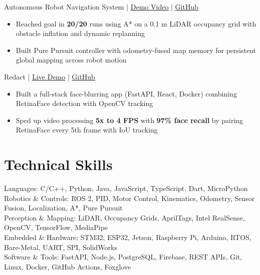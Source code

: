 \documentclass[11pt]{article}       %
\newcommand{\textsb}[1]{{\fontseries{sb}\selectfont #1}}
\begin{document}
\vspace{6pt}

\textsb{Autonomous Robot Navigation System} | \href{https://youtu.be/CKogSlk9C5I}{\underline{Demo Video}} | \href{autohttps://github.com/LegendaryArk/wato_asd_training}{\underline{GitHub}}
\begin{itemize}
    \item Reached goal in \textbf{20/20} runs using A* on a 0.1 m LiDAR occupancy grid with obstacle inflation and dynamic replanning
    \item Built Pure Pursuit controller with odometry-fused map memory for persistent global mapping across robot motion
\end{itemize}

\vspace{6pt}

\textsb{Redact} | \href{https://redact.sunnoah.ca}{\underline{Live Demo}} | \href{https://github.com/LegendaryArk/Redact}{\underline{GitHub}}
\begin{itemize}
    \item Built a full-stack face-blurring app (FastAPI, React, Docker) combining RetinaFace detection with OpenCV tracking
    \item Sped up video processing \textbf{5x to 4 FPS} with \textbf{97\% face recall} by pairing RetinaFace every 5th frame with IoU tracking
\end{itemize}



\section*{Technical Skills}
\textsb{Languages:} C/C++, Python, Java, JavaScript, TypeScript, Dart, MicroPython \\[-1pt]
\textsb{Robotics \& Controls:} ROS 2, PID, Motor Control, Kinematics, Odometry, Sensor Fusion, Localization, A*, Pure Pursuit \\[-1pt]
\textsb{Perception \& Mapping:} LiDAR, Occupancy Grids, AprilTags, Intel RealSense, OpenCV, TensorFlow, MediaPipe \\[-1pt]
\textsb{Embedded \& Hardware:} STM32, ESP32, Jetson, Raspberry Pi, Arduino, RTOS, Bare-Metal, UART, SPI, SolidWorks \\[-1pt]
\textsb{Software \& Tools:} FastAPI, Node.js, PostgreSQL, Firebase, REST APIs, Git, Linux, Docker, GitHub Actions, Foxglove
\end{document}

